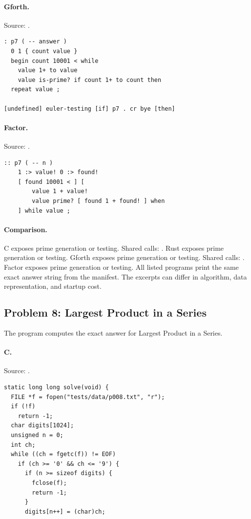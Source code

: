 \paragraph{Gforth.} Source: .
\begin{lstlisting}
: p7 ( -- answer )
  0 1 { count value }
  begin count 10001 < while
    value 1+ to value
    value is-prime? if count 1+ to count then
  repeat value ;

[undefined] euler-testing [if] p7 . cr bye [then]
\end{lstlisting}

\paragraph{Factor.} Source: .
\begin{lstlisting}
:: p7 ( -- n )
    1 :> value! 0 :> found!
    [ found 10001 < ] [
        value 1 + value!
        value prime? [ found 1 + found! ] when
    ] while value ;
\end{lstlisting}

\paragraph{Comparison.}
C exposes prime generation or testing. Shared calls: \texttt{}. Rust exposes prime generation or testing. Gforth exposes prime generation or testing. Shared calls: \texttt{}. Factor exposes prime generation or testing.
All listed programs print the same exact answer string from the manifest. The excerpts can differ in algorithm, data representation, and startup cost.

\subsection{Problem 8: Largest Product in a Series}
\label{walkthrough:p8}
The program computes the exact answer for Largest Product in a Series.

\paragraph{C.} Source: .
\begin{lstlisting}
static long long solve(void) {
  FILE *f = fopen("tests/data/p008.txt", "r");
  if (!f)
    return -1;
  char digits[1024];
  unsigned n = 0;
  int ch;
  while ((ch = fgetc(f)) != EOF)
    if (ch >= '0' && ch <= '9') {
      if (n >= sizeof digits) {
        fclose(f);
        return -1;
      }
      digits[n++] = (char)ch;
\end{lstlisting}

